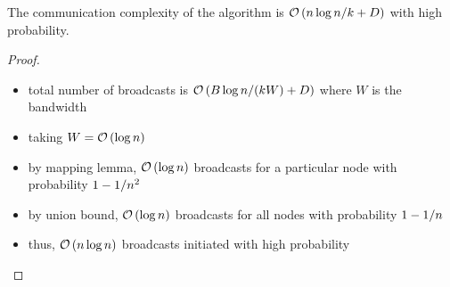 \begin{frame}
    \begin{lemma}
        The communication complexity of the algorithm is $\mathcal{O}\left(n\log n/k + D\right)$
        with high probability.
    \end{lemma}
    \begin{proof}
        \begin{itemize}
            \item total number of broadcasts is $\mathcal{O}\left(B\log{n} / (kW) + D\right)$ where $W$ is the bandwidth
            \item taking $W = \mathcal{O}\left(\log{n}\right)$
            \item by mapping lemma, $\mathcal{O}\left(\log{n}\right)$ broadcasts for a particular
                  node with probability $1 - 1 / n^2$
            \item by union bound, $\mathcal{O}\left(\log{n}\right)$ broadcasts for all nodes with
                  probability $1 - 1 / n$
            \item thus, $\mathcal{O}\left(n\log{n}\right)$ broadcasts initiated with high probability
        \end{itemize}
    \end{proof}
\end{frame}